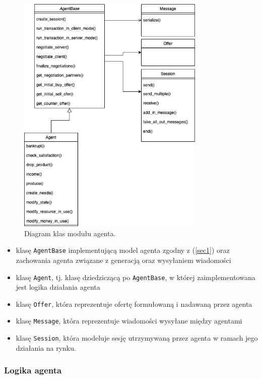 \documentclass{article}
\begin{document}
\begin{figure}[H]
	\centering
	\includegraphics[width=0.8\textwidth, height=0.8\textheight]{./png/agent-uml.png}
	\caption{Diagram klas modułu agenta.}
	\label{uml-agent}
\end{figure}

\begin{itemize}
	\item klasę \texttt{AgentBase} implementującą model agenta zgodny z (\ref{sec1}) oraz zachowania agenta
		związane z generacją oraz wysyłaniem wiadomości
	\item klasę \texttt{Agent}, tj. klasę dziedziczącą po \texttt{AgentBase}, w której zaimplementowana jest logika 
		działania agenta
	\item klasę \texttt{Offer}, która reprezentuje ofertę formułowaną i nadawaną przez agenta
	\item klasę \texttt{Message}, która reprezentuje wiadomości wysyłane między agentami
	\item klasę \texttt{Session}, która modeluje sesję utrzymywaną przez agenta w ramach jego działania na rynku. 
\end{itemize}

\subsubsection{Logika agenta}
\end{document}
